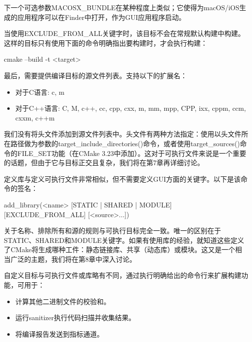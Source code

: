 下一个可选参数MACOSX\_BUNDLE在某种程度上类似；它使得为macOS/iOS生成的应用程序可以在Finder中打开，作为GUI应用程序启动。

当使用EXCLUDE\_FROM\_ALL关键字时，该目标不会在常规默认构建中构建。这样的目标只有使用下面的命令明确指出要构建时，才会执行构建：

\begin{shell}
cmake --build -t <target>
\end{shell}

最后，需要提供编译目标的源文件列表。支持以下的扩展名：

\begin{itemize}
\item
对于C语言: c, m

\item
对于C++语言: C, M, c++, cc, cpp, cxx, m, mm, mpp, CPP, ixx, cppm, ccm, cxxm, c++m
\end{itemize}

我们没有将头文件添加到源文件列表中。头文件有两种方法指定：使用以头文件所在路径做为参数的target\_include\_directories()命令，或者使用target\_sources()命令的FILE\_SET功能（在CMake 3.23中添加）。这对于可执行文件来说是一个重要的话题，但由于它与目标正交且复杂，我们将在第7章再详细讨论。


定义库与定义可执行文件非常相似，但不需要定义GUI方面的关键字。以下是该命令的签名：

\begin{shell}
add_library(<name> [STATIC | SHARED | MODULE]
            [EXCLUDE_FROM_ALL]
            [<source>...])
\end{shell}

关于名称、排除所有和源的规则与可执行目标完全一致。唯一的区别在于STATIC、SHARED和MODULE关键字。如果有使用库的经验，就知道这些定义了CMake将生成哪种工件：静态链接库、共享（动态库）或模块。这又是一个相当广泛的主题，我们将在第8章中深入讨论。


自定义目标与可执行文件或库略有不同，通过执行明确给出的命令行来扩展构建功能，可用于：

\begin{itemize}
\item
计算其他二进制文件的校验和。

\item
运行sanitizer执行代码扫描并收集结果。

\item
将编译报告发送到指标通道。
\end{itemize}

